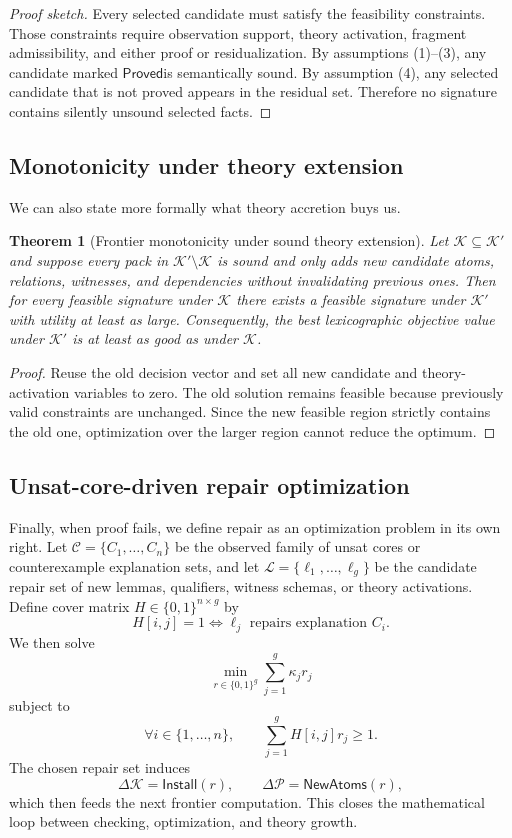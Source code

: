 \documentclass[11pt]{article}
\newcommand{\Proved}{\ensuremath{\mathsf{Proved}}}
\theoremstyle{definition}
\theoremstyle{plain}
\newtheorem{theorem}[definition]{Theorem}
\begin{document}
\begin{proof}[Proof sketch]
Every selected candidate must satisfy the feasibility constraints. Those
constraints require observation support, theory activation, fragment
admissibility, and either proof or residualization. By assumptions (1)--(3), any
candidate marked \Proved is semantically sound. By assumption (4), any selected
candidate that is not proved appears in the residual set. Therefore no signature
contains silently unsound selected facts.
\end{proof}

\subsection{Monotonicity under theory extension}
We can also state more formally what theory accretion buys us.

\begin{theorem}[Frontier monotonicity under sound theory extension]
Let $\mathcal{K} \subseteq \mathcal{K}'$ and suppose every pack in
$\mathcal{K}' \setminus \mathcal{K}$ is sound and only adds new candidate atoms,
relations, witnesses, and dependencies without invalidating previous ones. Then
for every feasible signature under $\mathcal{K}$ there exists a feasible
signature under $\mathcal{K}'$ with utility at least as large. Consequently, the
best lexicographic objective value under $\mathcal{K}'$ is at least as good as
under $\mathcal{K}$.
\end{theorem}

\begin{proof}
Reuse the old decision vector and set all new candidate and theory-activation
variables to zero. The old solution remains feasible because previously valid
constraints are unchanged. Since the new feasible region strictly contains the old
one, optimization over the larger region cannot reduce the optimum.
\end{proof}

\subsection{Unsat-core-driven repair optimization}
Finally, when proof fails, we define repair as an optimization problem in its own
right. Let $\mathcal{C} = \{C_1, \ldots, C_n\}$ be the observed family of unsat
cores or counterexample explanation sets, and let $\mathcal{L} = \{\ell_1,
\ldots, \ell_g\}$ be the candidate repair set of new lemmas, qualifiers, witness
schemas, or theory activations. Define cover matrix
$H \in \{0,1\}^{n \times g}$ by
\[
H[i,j] = 1 \iff \ell_j \text{ repairs explanation } C_i.
\]
We then solve
\[
\min_{r \in \{0,1\}^g} \sum_{j=1}^{g} \kappa_j r_j
\]
subject to
\[
\forall i \in \{1,\ldots,n\}, \qquad \sum_{j=1}^{g} H[i,j] r_j \ge 1.
\]
The chosen repair set induces
\[
\Delta \mathcal{K} = \mathsf{Install}(r),
\qquad
\Delta \mathcal{P} = \mathsf{NewAtoms}(r),
\]
which then feeds the next frontier computation. This closes the mathematical loop
between checking, optimization, and theory growth.
\end{document}
